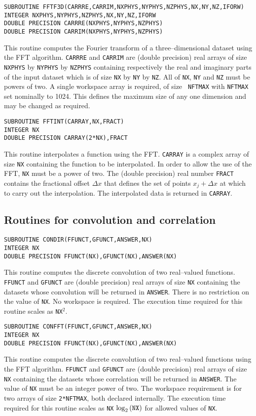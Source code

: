 \documentclass[dvips]{article}
\begin{document}
\begin{verbatim}
SUBROUTINE FFTF3D(CARRRE,CARRIM,NXPHYS,NYPHYS,NZPHYS,NX,NY,NZ,IFORW)
INTEGER NXPHYS,NYPHYS,NZPHYS,NX,NY,NZ,IFORW
DOUBLE PRECISION CARRRE(NXPHYS,NYPHYS,NZPHYS)
DOUBLE PRECISION CARRIM(NXPHYS,NYPHYS,NZPHYS)
\end{verbatim}
This routine computes the Fourier transform of a three--dimensional dataset
using the FFT algorithm.
{\tt CARRRE} and {\tt CARRIM} are (double precision) real arrays
of size {\tt NXPHYS} by {\tt NYPHYS} by {\tt NZPHYS} containing respectively the real and
imaginary parts of the input dataset which is of size {\tt NX} by {\tt NY} by {\tt NZ}.
All of {\tt NX}, {\tt NY} and {\tt NZ}
must be powers of two.   A single workspace array is required, of size {\tt
NFTMAX} with {\tt NFTMAX} set nominally to 1024.  This defines the
maximum size of any one dimension and may be changed as required.

\begin{verbatim}
SUBROUTINE FFTINT(CARRAY,NX,FRACT)
INTEGER NX
DOUBLE PRECISION CARRAY(2*NX),FRACT
\end{verbatim}
This routine interpolates a function using the FFT.
{\tt CARRAY} is a complex array of size {\tt NX} containing the
function to be interpolated.  In order to allow the use of the FFT, {\tt NX}
must be a power of two.  The (double precision) real number {\tt FRACT} contains
the fractional offset $\Delta x$ that defines the set of points
$x_{j}+\Delta x$ at which to carry out the interpolation.  The
interpolated data is returned in {\tt CARRAY}.

\subsection*{Routines for convolution and correlation}
\begin{verbatim}
SUBROUTINE CONDIR(FFUNCT,GFUNCT,ANSWER,NX)
INTEGER NX
DOUBLE PRECISION FFUNCT(NX),GFUNCT(NX),ANSWER(NX)
\end{verbatim}
This routine computes the discrete convolution of two real--valued functions.
{\tt FFUNCT} and {\tt GFUNCT} are (double precision) real arrays of size
{\tt NX} containing
the datasets whose convolution will be returned in {\tt ANSWER}.  There is no
restriction on the value of {\tt NX}.  No workspace is required.  The execution time
required for this routine scales as {\tt NX}$^{2}$.

\begin{verbatim}
SUBROUTINE CONFFT(FFUNCT,GFUNCT,ANSWER,NX)
INTEGER NX
DOUBLE PRECISION FFUNCT(NX),GFUNCT(NX),ANSWER(NX)
\end{verbatim}
This routine computes the discrete convolution of two real--valued functions
using the FFT algorithm.
{\tt FFUNCT} and {\tt GFUNCT} are (double precision) real arrays of size
{\tt NX} containing
the datasets whose correlation will be returned in {\tt ANSWER}.  The value of
{\tt NX} must be an integer power of two.  The workspace requirement is for two
arrays of size {\tt 2*NFTMAX}, both declared internally.  The execution time
required for this routine scales as {\tt NX} $\log_{2}{({\tt NX})}$ for allowed
values of {\tt NX}.
\end{document}
